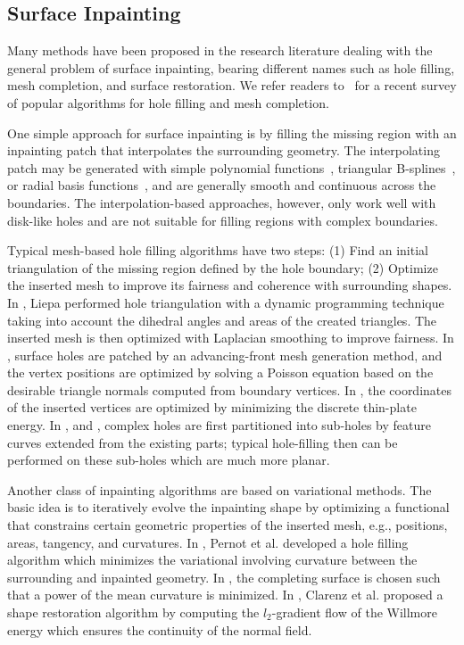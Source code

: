 \subsection{Surface Inpainting}

Many methods have been proposed in the research literature dealing
with the general problem of surface inpainting, bearing different
names such as hole filling, mesh completion, and surface restoration.
We refer readers to~\cite{Attene2013} for a recent survey of popular
algorithms for hole filling and mesh completion.

One simple approach for surface inpainting is by filling the missing
region with an inpainting patch that interpolates the surrounding
geometry. The interpolating patch may be generated with simple
polynomial functions~\cite{Wang2007}, triangular
B-splines~\cite{Pfeifle1996}, or radial basis
functions~\cite{Branch2006}, and are generally smooth and continuous
across the boundaries. The interpolation-based approaches, however,
only work well with disk-like holes and are not suitable for filling
regions with complex boundaries.

Typical mesh-based hole filling algorithms have two steps: (1) Find an
initial triangulation of the missing region defined by the hole
boundary; (2) Optimize the inserted mesh to improve its fairness and
coherence with surrounding shapes. In \cite{Liepa2003}, Liepa
performed hole triangulation with a dynamic programming technique
taking into account the dihedral angles and areas of the created
triangles. The inserted mesh is then optimized with Laplacian
smoothing to improve fairness. In \cite{Zhao2007}, surface holes are
patched by an advancing-front mesh generation method, and the vertex
positions are optimized by solving a Poisson equation based on the
desirable triangle normals computed from boundary vertices. In \cite{Bac2008},
the coordinates of the inserted vertices are optimized by minimizing the
discrete thin-plate energy.
In \cite{Li2010}, \cite{Wang2012} and \cite{Ngo2013}, complex holes are
first partitioned into sub-holes by feature curves extended from the
existing parts; typical hole-filling then can be performed on these
sub-holes which are much more planar.

Another class of inpainting algorithms are based on variational
methods. The basic idea is to iteratively evolve the inpainting shape
by optimizing a functional that constrains certain geometric
properties of the inserted mesh, e.g., positions, areas, tangency, and
curvatures. In \cite{Pernot2006}, Pernot et al. developed a hole
filling algorithm which minimizes the variational involving curvature
between the surrounding and inpainted geometry. In
\cite{Caselles2008}, the completing surface is chosen such that a
power of the mean curvature is minimized. In \cite{Clarenz2004},
Clarenz et al. proposed a shape restoration algorithm by computing the
$l_2$-gradient flow of the Willmore energy which ensures the
continuity of the normal field.

